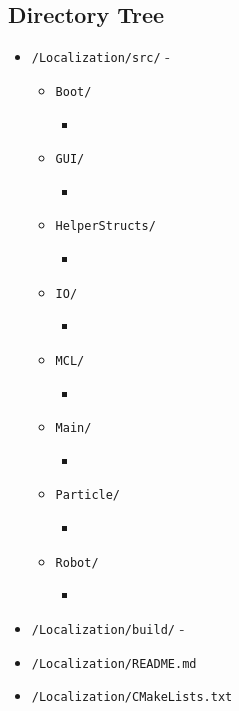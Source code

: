 \documentclass[a4paper,11pt]{article}
\begin{document}
  \subsection{Directory Tree}
  \begin{itemize}
    \item \texttt{/Localization/src/} -
    \begin{itemize}
      \item \texttt{Boot/}
      \begin{itemize}
	\item 
      \end{itemize}
      \item \texttt{GUI/}
      \begin{itemize}
        \item 
      \end{itemize}
      \item \texttt{HelperStructs/}
      \begin{itemize}
          \item 
      \end{itemize}
      \item \texttt{IO/}
      \begin{itemize}
          \item 
      \end{itemize}
      \item \texttt{MCL/}
      \begin{itemize}
          \item 
      \end{itemize}
      \item \texttt{Main/}
      \begin{itemize}
          \item 
      \end{itemize}
      \item \texttt{Particle/}
      \begin{itemize}
          \item 
      \end{itemize}
      \item \texttt{Robot/}
      \begin{itemize}
          \item 
      \end{itemize}
    \end{itemize}
    \item \texttt{/Localization/build/} -
    \item \texttt{/Localization/README.md}
    \item \texttt{/Localization/CMakeLists.txt}
  \end{itemize}
\end{document}
